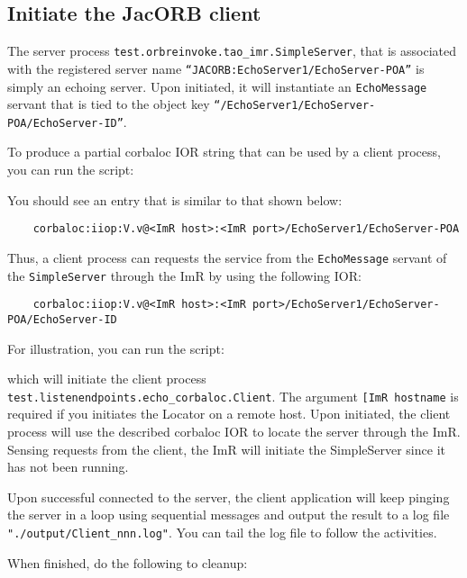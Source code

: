 \subsection{Initiate the JacORB client}

The server process {\tt test.orbreinvoke.tao\_imr.SimpleServer},  that is
associated with the registered server name
{\tt “JACORB:EchoServer1/EchoServer-POA”} is simply an echoing server.
Upon initiated, it will instantiate an {\tt EchoMessage} servant that is tied to
the object key {\tt “/EchoServer1/EchoServer-POA/EchoServer-ID”}.

To produce a partial corbaloc IOR string that can be used by a client process,
you can run the script:


You should see an entry that is similar to that shown below:

\small{
\begin{verbatim}
    corbaloc:iiop:V.v@<ImR host>:<ImR port>/EchoServer1/EchoServer-POA
\end{verbatim}
}

Thus, a client process can requests the service from the {\tt EchoMessage} servant
of the {\tt SimpleServer} through the ImR by using the following IOR:

\small{
\begin{verbatim}
    corbaloc:iiop:V.v@<ImR host>:<ImR port>/EchoServer1/EchoServer-POA/EchoServer-ID
\end{verbatim}
}

For illustration, you can run the script:


which will initiate the client process {\tt test.listenendpoints.echo\_corbaloc.Client}.
The argument {\tt [ImR hostname} is required if you initiates the Locator on a
remote host.  Upon initiated, the client process will use the described corbaloc
IOR to locate the server through the ImR.  Sensing requests from the client,
the ImR will initiate the SimpleServer since it has not been running.

Upon successful connected to the server, the client application will keep pinging
the server in a loop using sequential messages and output the result to a log file
{\tt"./output/Client\_nnn.log"}.  You can tail the log file to follow the activities.

When finished, do the following to cleanup:

